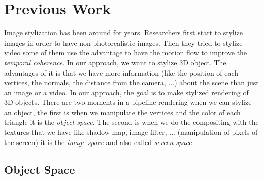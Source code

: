\chapter{Previous Work}

Image stylization has been around for years. Researchers first start to stylize images \cite{litwinowicz_processing_1997, hays_image_2004, rosin_stroke_2013, zeng_image_2009, kyprianidis_image_2009, lu_interactive_2010, litwinowicz_processing_1997, kyprianidis_state_2013} in order to have non-photorealistic images. Then they tried to stylize video\cite{lin_video_nodate, litwinowicz_processing_1997, kyprianidis_state_2013, bousseau_video_2007} some of them use the advantage to have the motion flow to improve the \textit{temporal coherence}. In our approach, we want to stylize 3D object. The advantages of it is that we have more information (like the position of each vertices, the normals, the distance from the camera, ...) about the scene than just an image or a video. In our approach, the goal is to make stylized rendering of 3D objects. There are two moments in a pipeline rendering when we can stylize an object, the first is when we manipulate the vertices and the color of each triangle it is the \textit{object space}. The second is when we do the compositing with the textures that we have like shadow map, image filter, ... (manipulation of pixels of the screen) it is the \textit{image space} and also called \textit{screen space}

\section{Object Space}

